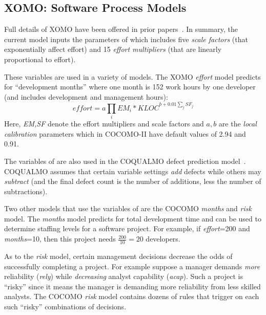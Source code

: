 
\subsection{XOMO: Software Process Models}\label{sec:xomoIs}

Full details of XOMO have been offered in prior papers~\cite{me07f,me09a,me09e}.
In summary, the current model inputs the parameters of 
which includes five {\em scale factors} (that exponentially affect effort)
and 15 {\em effort multipliers} (that are linearly proportional to effort).  

These variables
are used in a variety of models. The XOMO {\em effort} model predicts for 
``development months'' where one month
is 152 work hours by one developer (and includes development and management hours): 
\begin{equation}\label{eq:cocII}
\mathit{effort}=a\prod_i EM_i *\mathit{KLOC}^{b+0.01\sum_j SF_j}
\end{equation}
Here, {\em EM,SF} denote the effort multipliers and scale
factors and
 $a,b$ are the {\em local calibration} parameters which in COCOMO-II
have default values of 2.94 and 0.91.

The variables of  are also  used in
the COQUALMO defect prediction
model~\cite{boehm00b}.  COQUALMO assumes that
certain variable settings {\em add} defects while
others may {\em subtract} (and the final defect count is the number of additions, less the
number of subtractions). 

Two other models that use the variables of  are the COCOMO {\em months} and {\em risk} model.
The {\em months} model predicts for total development time and   can be used to determine staffing levels
for a software project. For example, if {\em effort}=200  
and {\em months}=10, then this project needs 
$\frac{200}{10} =20$
developers.

As to the {\em risk} model, certain management decisions decrease the 
odds of successfully completing a project. For example suppose a manager demands
{\em more}  reliability ({\em rely}) while  {\em decreasing} analyst capability ({\em acap}).
Such a project is ``risky'' since it means the manager is demanding more reliability from less skilled analysts.
The COCOMO {\em risk} model contains dozens of rules that trigger on each
such ``risky'' combinations of decisions. 

